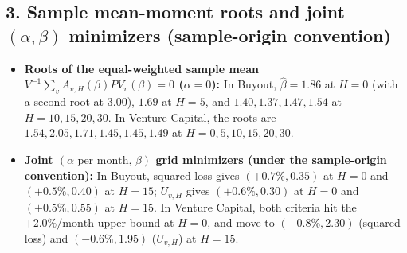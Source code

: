 \documentclass[11pt]{article}
\begin{document}
\subsection*{3. Sample mean-moment roots and joint $(\alpha,\beta)$ minimizers (sample-origin convention)}

\begin{itemize}
\item \textbf{Roots of the equal-weighted sample mean $V^{-1}\sum_v A_{v,H}(\beta)PV_v(\beta)=0$ ($\alpha=0$):} In Buyout, $\hat\beta=1.86$ at $H=0$ (with a second root at $3.00$), $1.69$ at $H=5$, and $1.40,1.37,1.47,1.54$ at $H=10,15,20,30$. In Venture Capital, the roots are $1.54,2.05,1.71,1.45,1.45,1.49$ at $H=0,5,10,15,20,30$.
\item \textbf{Joint $(\alpha\text{ per month},\,\beta)$ grid minimizers (under the sample-origin convention):} In Buyout, squared loss gives $(+0.7\%,0.35)$ at $H=0$ and $(+0.5\%,0.40)$ at $H=15$; $U_{v,H}$ gives $(+0.6\%,0.30)$ at $H=0$ and $(+0.5\%,0.55)$ at $H=15$. In Venture Capital, both criteria hit the $+2.0\%/\text{month}$ upper bound at $H=0$, and move to $(-0.8\%,2.30)$ (squared loss) and $(-0.6\%,1.95)$ ($U_{v,H}$) at $H=15$.
\end{itemize}

\endgroup
\end{document}
